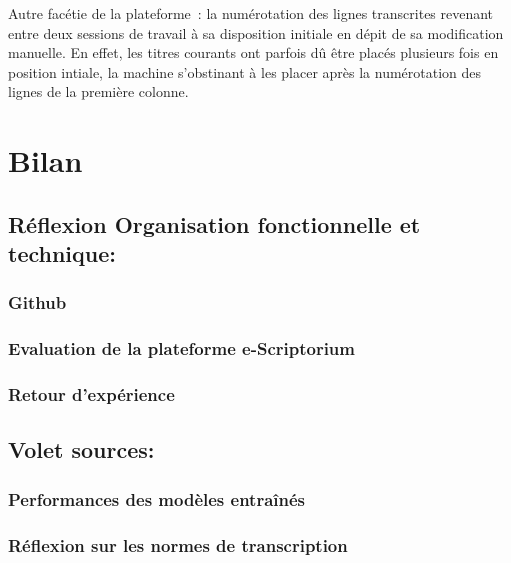 \documentclass{article}
\begin{document}
Autre facétie de la plateforme~: la numérotation des lignes transcrites revenant entre deux sessions de travail à sa disposition initiale en dépit de sa modification manuelle. En effet, les titres courants ont parfois dû être placés plusieurs fois en position intiale, la machine s'obstinant à les placer après la numérotation des lignes de la première colonne.

\section{Bilan}

\subsection{Réflexion Organisation fonctionnelle et technique:}
\subsubsection{Github}
\subsubsection{Evaluation de la plateforme e-Scriptorium}
\subsubsection{Retour d'expérience}
\subsection{Volet sources:}
\subsubsection{Performances des modèles entraînés}
\subsubsection{Réflexion sur les normes de transcription}

\printbibliography
\end{document}

